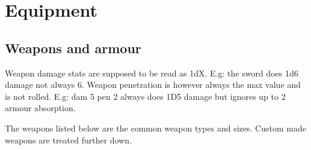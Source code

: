 

\cleardoublepage

\chapter*{Equipment}




\section*{Weapons and armour}

Weapon damage stats are supposed to be read as 1dX. E.g: the sword does 1d6 damage not always 6. Weapon penetration is however always the max value and is not rolled. E.g: dam 5 pen 2 always does 1D5 damage but ignores up to 2 armour absorption.

The weapons listed below are the common weapon types and sizes. Custom made weapons are treated further down.



%


